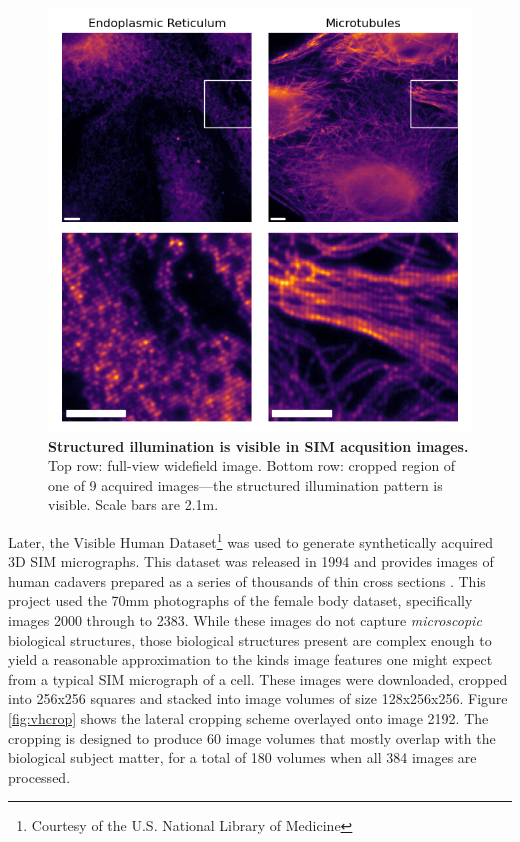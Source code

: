 \documentclass[12pt]{article}
\begin{document}
\begin{figure}[hbtp]
    \includegraphics[scale=1, center]{figures/2DSIM.png}
    \caption{\textbf{Structured illumination is visible in SIM acqusition images.}
    Top row: full-view widefield image. Bottom row: cropped region of one of 9 acquired images---the structured illumination pattern is visible.
    Scale bars are 2.1\textmu m.}
    \label{fig:2DSIM}
\end{figure}

Later, the Visible Human Dataset\footnote{Courtesy of the U.S. National Library of Medicine} was used to generate synthetically acquired 3D SIM micrographs.
This dataset was released in 1994 and provides images of human cadavers prepared as a series of thousands of thin cross sections \cite{vhdata}.
This project used the 70mm photographs of the female body dataset, specifically images 2000 through to 2383.
While these images do not capture \textit{microscopic} biological structures,
those biological structures present are complex enough to yield a reasonable approximation to the kinds image features one might expect from a typical SIM micrograph of a cell.
These images were downloaded, cropped into 256x256 squares and stacked into image volumes of size 128x256x256.
Figure \ref{fig:vhcrop} shows the lateral cropping scheme overlayed onto image 2192.
The cropping is designed to produce 60 image volumes that mostly overlap with the biological subject matter,
for a total of 180 volumes when all 384 images are processed.
\end{document}
